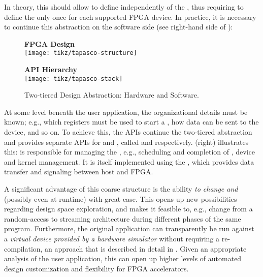 In theory, this should allow to define  independently of the , thus requiring to define the  only once for each supported FPGA device.
In practice, it is necessary to continue this abstraction on the software side (see right-hand side of ):
%
\begin{figure}
  \begin{minipage}{.5\textwidth}%
  \begin{center}\textbf{FPGA Design}\\\texttt{[image: tikz/tapasco-structure]}\end{center}%
  \end{minipage}%
  \begin{minipage}{.5\textwidth}%
  \begin{center}\textbf{API Hierarchy}\\\texttt{[image: tikz/tapasco-stack]}\end{center}%
  \end{minipage}

  \caption{Two-tiered Design Abstraction: Hardware and Software.}
  \label{fig:two-tiered-design-abstraction}
\end{figure}
%
At some level beneath the user application, the organizational details must be known; e.g., which registers must be used to start a , how data can be sent to the device, and so on.
To achieve this, the \tapasco{} APIs continue the two-tiered abstraction and provides separate APIs for  and , called  and  respectively.
 (right) illustrates this:
 is responsible for managing the , e.g., scheduling and completion of , device and kernel management.
It is itself implemented using the , which provides data transfer and signaling between host and FPGA.

\medskip
A significant advantage of this coarse structure is the ability \emph{to change  and } (possibly even at runtime) with great ease.
This opens up new possibilities regarding design space exploration, and makes it feasible to, e.g., change from a random-access to streaming architecture during different phases of the same program.
Furthermore, the original application can transparently be run against a \emph{virtual device provided by a hardware simulator} without requiring a re-compilation, an approach that is described in detail in .
Given an appropriate analysis of the user application, this can open up higher levels of automated design customization and flexibility for FPGA accelerators.

